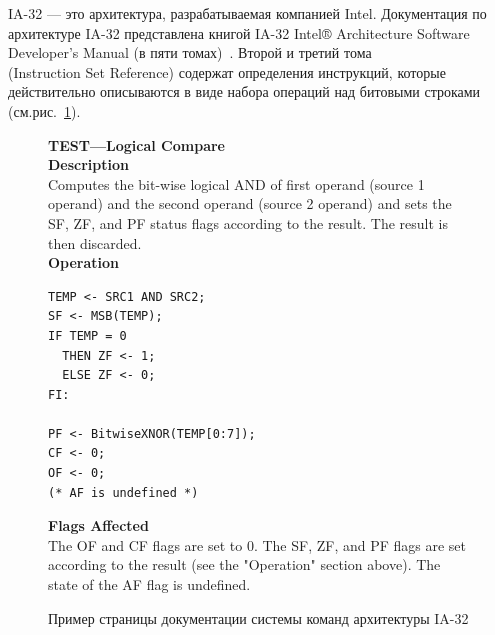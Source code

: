 IA-32 --- это архитектура, разрабатываемая компанией Intel. Документация по
архитектуре IA-32 представлена книгой IA-32 Intel® Architecture
Software Developer’s Manual (в пяти томах)~\cite{IA32}. Второй и третий тома \\(Instruction Set Reference) содержат определения инструкций, которые действительно описываются в виде набора операций над битовыми строками (см.рис.~\ref{fig:ia32_page}).

\begin{figure}
\textbf{TEST—Logical Compare}\\

\textbf{Description}\\
Computes the bit-wise logical AND of first operand (source 1 operand) and the second operand
(source 2 operand) and sets the SF, ZF, and PF status flags according to the result. The result is
then discarded.\\

\textbf{Operation}
\begin{verbatim}
TEMP <- SRC1 AND SRC2;
SF <- MSB(TEMP);
IF TEMP = 0
  THEN ZF <- 1;
  ELSE ZF <- 0;
FI:

PF <- BitwiseXNOR(TEMP[0:7]);
CF <- 0;
OF <- 0;
(* AF is undefined *)
\end{verbatim}

\textbf{Flags Affected}\\
The OF and CF flags are set to 0. The SF, ZF, and PF flags are set according to the result (see
the "Operation" section above). The state of the AF flag is undefined.

\caption{Пример страницы документации системы команд архитектуры IA-32}\label{fig:ia32_page}
\end{figure}

